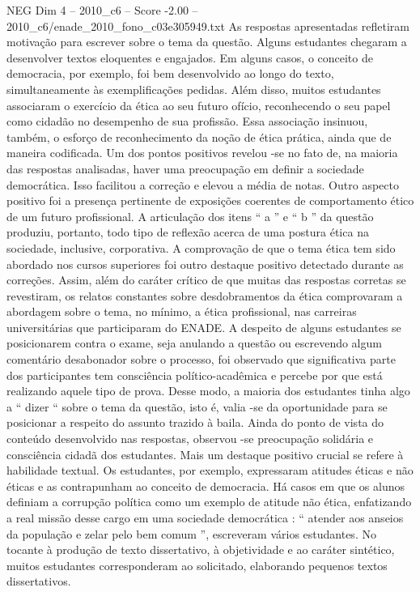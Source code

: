 \begin{textsample}{NEG Dim 4 – 2010\_c6 – Score -2.00 – 2010\_c6/enade\_2010\_fono\_c03e305949.txt}
As respostas apresentadas refletiram motivação para escrever sobre o tema da questão.
Alguns estudantes chegaram a desenvolver textos eloquentes e engajados.
Em alguns casos, o conceito de democracia, por exemplo, foi bem desenvolvido ao longo do texto, simultaneamente às exemplificações pedidas.
Além disso, muitos estudantes associaram o exercício da ética ao seu futuro ofício, reconhecendo o seu papel como cidadão no desempenho de sua profissão.
Essa associação insinuou, também, o esforço de reconhecimento da noção de ética prática, ainda que de maneira codificada.
Um dos pontos positivos revelou -se no fato de, na maioria das respostas analisadas, haver uma preocupação em definir a sociedade democrática.
Isso facilitou a correção e elevou a média de notas.
Outro aspecto positivo foi a presença pertinente de exposições coerentes de comportamento ético de um futuro profissional.
A articulação dos itens “ a ” e “ b ” da questão produziu, portanto, todo tipo de reflexão acerca de uma postura ética na sociedade, inclusive, corporativa.
A comprovação de que o tema ética tem sido abordado nos cursos superiores foi outro destaque positivo detectado durante as correções.
Assim, além do caráter crítico de que muitas das respostas corretas se revestiram, os relatos constantes sobre desdobramentos da ética comprovaram a abordagem sobre o tema, no mínimo, a ética profissional, nas carreiras universitárias que participaram do ENADE.
A despeito de alguns estudantes se posicionarem contra o exame, seja anulando a questão ou escrevendo algum comentário desabonador sobre o processo, foi observado que significativa parte dos participantes tem consciência político-acadêmica e percebe por que está realizando aquele tipo de prova.
Desse modo, a maioria dos estudantes tinha algo a “ dizer “ sobre o tema da questão, isto é, valia -se da oportunidade para se posicionar a respeito do assunto trazido à baila.
Ainda do ponto de vista do conteúdo desenvolvido nas respostas, observou -se preocupação solidária e consciência cidadã dos estudantes.
Mais um destaque positivo crucial se refere à habilidade textual.
Os estudantes, por exemplo, expressaram atitudes éticas e não éticas e as contrapunham ao conceito de democracia.
Há casos em que os alunos definiam a corrupção política como um exemplo de atitude não ética, enfatizando a real missão desse cargo em uma sociedade democrática : “ atender aos anseios da população e zelar pelo bem comum ”, escreveram vários estudantes.
No tocante à produção de texto dissertativo, à objetividade e ao caráter sintético, muitos estudantes corresponderam ao solicitado, elaborando pequenos textos dissertativos.

\end{textsample}
